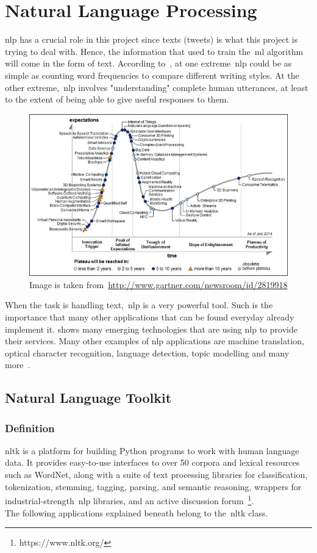 \section{Natural Language Processing}
\ac{nlp} has a crucial role in this project since texts (tweets) is what this project is trying to deal with. Hence, the information that used to train the~\ac{ml} algorithm will come in the form of text. According to~\cite{bird2009natural}, at one extreme~\ac{nlp} could be as simple as counting word frequencies to compare different writing styles. At the other extreme,~\ac{nlp} involves "understanding" complete human utterances, at least to the extent of being able to give useful responses to them.\\
\begin{figure}
	\hspace{-1.45cm}
	\includegraphics[]{img/nlp.jpg}
	\caption{Image is taken from~\url{http://www.gartner.com/newsroom/id/2819918}}
	\label{fig:nlptech}
\end{figure}
When the task is handling text,~\ac{nlp} is a very powerful tool. Such is the importance that many other applications that can be found everyday already implement it.  shows many emerging technologies that are using \ac{nlp} to provide their services.
Many other examples of \ac{nlp} applications are machine translation, optical character recognition, language detection, topic modelling and many more~\cite{stopwords}.

\label{sec:NLP}
\subsection{Natural Language Toolkit}
\subsubsection{Definition}
\ac{nltk} is a platform for building Python programs to work with human language data. It provides easy-to-use interfaces to over 50 corpora and lexical resources such as WordNet, along with a suite of text processing libraries for classification, tokenization, stemming, tagging, parsing, and semantic reasoning, wrappers for industrial-strength~\ac{nlp} libraries, and an active discussion forum~\footnote{https://www.nltk.org/}.\\
The following applications explained beneath belong to the~\ac{nltk} class.
